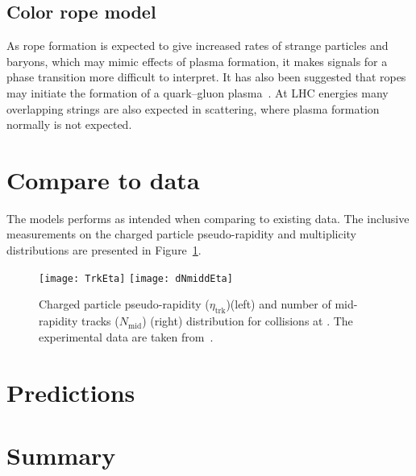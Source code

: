 \documentclass[ALICE,manyauthors]{StrinJet}
\begin{document}
\subsection{Color rope model}
\label{subsec:rope}

As rope formation is expected to give increased rates of strange particles and baryons, which may mimic effects of plasma formation, it makes signals for a phase transition more difficult to interpret.
It has also been suggested that ropes may initiate the formation of a quark–gluon plasma~\cite{Gyulassy:1985oqt, Kajantie:1985jh, Gatoff:1987uf, Braun:1997ch}.
At LHC energies many overlapping strings are also expected in \pp scattering, where plasma formation normally is not expected.

\section{Compare to data}
\label{sec:com2da}
The models performs as intended when comparing to existing data.
The inclusive measurements on the charged particle pseudo-rapidity and multiplicity distributions are presented in Figure~\ref{fig:trkinfo}.
\begin{figure}[htp]
	\begin{center}
		\texttt{[image: TrkEta]}
		\texttt{[image: dNmiddEta]}
	\end{center}
	\caption{Charged particle pseudo-rapidity ($\eta_\mathrm{trk}$)(left) and number of mid-rapidity tracks ($N_\mathrm{mid}$) (right) distribution for \pp collisions at \seven.  The experimental data are taken from~\cite{ALICE:2010mty}.}
	\label{fig:trkinfo}
\end{figure}


\section{Predictions}
\label{sec:predic}

\section{Summary}
\label{sec:sum}


\newenvironment{acknowledgement}{\relax}{\relax}
%
\end{document}
